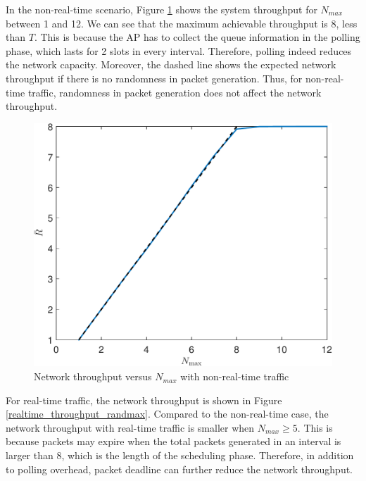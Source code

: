 \documentclass{article}
\begin{document}
In the non-real-time scenario, Figure \ref{nonrealtime_throughput_randmax} shows the system throughput for $N_{max}$ between 1 and 12. We can see that the maximum achievable throughput is 8, less than $T$. This is because the AP has to collect the queue information in the polling phase, which lasts for 2 slots in every interval. Therefore, polling indeed reduces the network capacity. Moreover, the dashed line shows the expected network throughput if there is no randomness in packet generation. Thus, for non-real-time traffic, randomness in packet generation does not affect the network throughput.
\begin{figure}[htbp]
\centering
\includegraphics[scale=0.5]{nonrealtime_throughput_randmax.pdf}
\caption{Network throughput versus $N_{max}$ with non-real-time traffic}
\label{nonrealtime_throughput_randmax}
\end{figure}

For real-time traffic, the network throughput is shown in Figure \ref{realtime_throughput_randmax}. Compared to the non-real-time case, the network throughput with real-time traffic is smaller when $N_{max}\geq 5$. This is because packets may expire when the total packets generated in an interval is larger than 8, which is the length of the scheduling phase. Therefore, in addition to polling overhead, packet deadline can further reduce the network throughput. 
\end{document}
